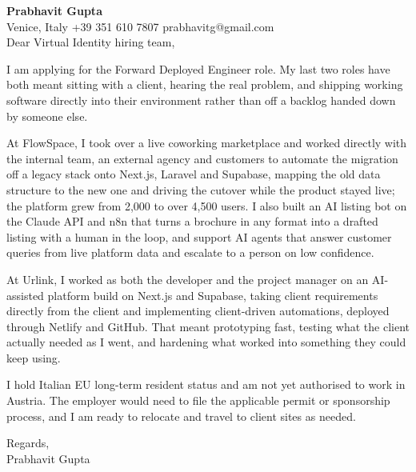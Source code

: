 \documentclass[a4paper,10.5pt]{article}
\begin{document}
\textbf{Prabhavit Gupta}\\
Venice, Italy \textbar{} +39 351 610 7807 \textbar{} prabhavitg@gmail.com\\[10pt]
Dear Virtual Identity hiring team,

I am applying for the Forward Deployed Engineer role. My last two roles have both meant sitting with a client, hearing the real problem, and shipping working software directly into their environment rather than off a backlog handed down by someone else.

At FlowSpace, I took over a live coworking marketplace and worked directly with the internal team, an external agency and customers to automate the migration off a legacy stack onto Next.js, Laravel and Supabase, mapping the old data structure to the new one and driving the cutover while the product stayed live; the platform grew from 2,000 to over 4,500 users. I also built an AI listing bot on the Claude API and n8n that turns a brochure in any format into a drafted listing with a human in the loop, and support AI agents that answer customer queries from live platform data and escalate to a person on low confidence.

At Urlink, I worked as both the developer and the project manager on an AI-assisted platform build on Next.js and Supabase, taking client requirements directly from the client and implementing client-driven automations, deployed through Netlify and GitHub. That meant prototyping fast, testing what the client actually needed as I went, and hardening what worked into something they could keep using.

I hold Italian EU long-term resident status and am not yet authorised to work in Austria. The employer would need to file the applicable permit or sponsorship process, and I am ready to relocate and travel to client sites as needed.

Regards,\\
Prabhavit Gupta
\end{document}
